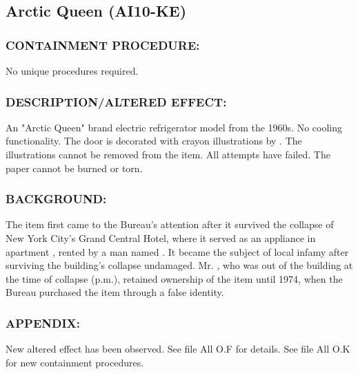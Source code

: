 \subsection*{Arctic Queen (AI10-KE)}
\subsubsection*{CONTAINMENT PROCEDURE:}
\par No unique procedures required.
\subsubsection*{DESCRIPTION/ALTERED EFFECT:}
\par An "Arctic Queen" brand electric
refrigerator model from the 1960s. No
cooling functionality. The door is
decorated with crayon illustrations by . The
illustrations cannot be removed from the item. All attempts have
failed. The paper cannot be burned or torn.
\subsubsection*{BACKGROUND:}
\par The item first came to the Bureau's attention after it survived the
collapse of New York City's Grand Central Hotel, where it served
as an appliance in apartment , rented by a man named . It became the subject of local infamy after surviving the building's collapse undamaged. Mr. , who was out of the building at the time of collapse (p.m.), retained ownership of the item until 1974, when
the Bureau purchased the item through a false identity.
\subsubsection*{APPENDIX:}
\par New altered effect has been observed. See file All O.F for details.
See file All O.K for new containment procedures.